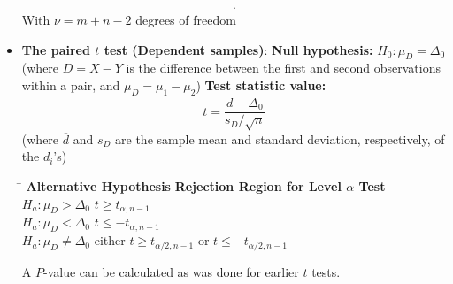 \documentclass{report}
\begin{document}
\begin{itemize}
\begin{align*}
        .\end{align*}
        With $\nu = m + n - 2$ degrees of freedom
    \item \textbf{The paired $t$ test (Dependent samples)}:
        \bigbreak \noindent 
        \textbf{Null hypothesis:} $H_0: \mu_D = \Delta_0$ \\
        (where $D = X - Y$ is the difference between the first and second observations within a pair, and $\mu_D = \mu_1 - \mu_2$)
        \bigbreak \noindent 
        \textbf{Test statistic value:}
        \[
            t = \frac{\overline{d} - \Delta_0}{s_D / \sqrt{n}}
        \]
        (where $\overline{d}$ and $s_D$ are the sample mean and standard deviation, respectively, of the $d_i$'s)
        \bigbreak \noindent 
        \begin{tabbing}
            \hspace{3cm} \= \kill
            \textbf{Alternative Hypothesis} \hspace{1.8cm} \textbf{Rejection Region for Level $\alpha$ Test} \\
            $H_a: \mu_D > \Delta_0$ \hspace{3.7cm} $t \ge t_{\alpha, n-1}$ \\
            $H_a: \mu_D < \Delta_0$ \hspace{3.7cm} $t \le -t_{\alpha, n-1}$ \\
            $H_a: \mu_D \neq \Delta_0$ \hspace{3.7cm} either $t \ge t_{\alpha/2, n-1}$ or $t \le -t_{\alpha/2, n-1}$ \\
        \end{tabbing}
        \bigbreak \noindent 
        A $P$-value can be calculated as was done for earlier $t$ tests.


\end{itemize}
\end{document}
